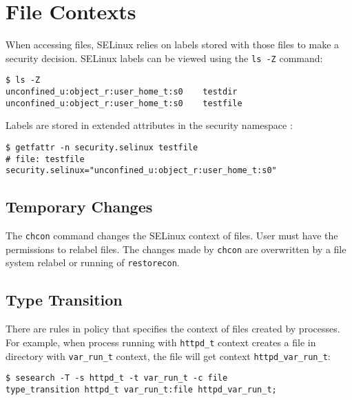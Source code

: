
\section{File Contexts}

When accessing files, SELinux relies on labels stored with those files to make a
security decision. SELinux labels can be viewed using the \texttt{ls -Z}
command:
\begin{lstlisting}
$ ls -Z
unconfined_u:object_r:user_home_t:s0    testdir
unconfined_u:object_r:user_home_t:s0    testfile
\end{lstlisting}
Labels are stored in extended attributes in the security namespace
\cite{xattrman}:
\begin{lstlisting}
$ getfattr -n security.selinux testfile
# file: testfile
security.selinux="unconfined_u:object_r:user_home_t:s0"
\end{lstlisting}

\subsection{Temporary Changes}
The \texttt{chcon} command changes the SELinux context of files. User must have
the permissions to relabel files. The changes made by \texttt{chcon} are
overwritten by a file system relabel or running of \texttt{restorecon}.

\subsection{Type Transition}
There are rules in policy that specifies the context of files created by
processes. For example, when process running with \texttt{httpd\_t} context
creates a file in directory with \texttt{var\_run\_t} context, the file will get
context \texttt{httpd\_var\_run\_t}:
\begin{lstlisting}
$ sesearch -T -s httpd_t -t var_run_t -c file
type_transition httpd_t var_run_t:file httpd_var_run_t;
\end{lstlisting}

